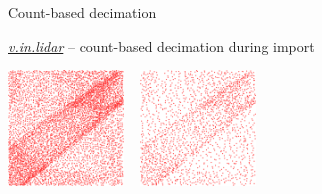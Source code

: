 \documentclass[xcolor={dvipsnames,usenames},beamer,aspectratio=169]{beamer}
\newcommand{\gmodule}[1]{\href{http://grass.osgeo.org/grass71/manuals/#1.html}{\emph{#1}}}
\begin{document}
\begin{frame}{Count-based decimation}

\gmodule{v.in.lidar} -- count-based decimation during import

\begin{center}
\begin{minipage}{0.96\textwidth}
%
\newcommand{\imgsize}{0.23\textwidth}
\includegraphics[width=\imgsize]{features/full}%
~%
\includegraphics[width=\imgsize]{features/preserve}%

\end{minipage}
\end{center}
\end{frame}
\end{document}
